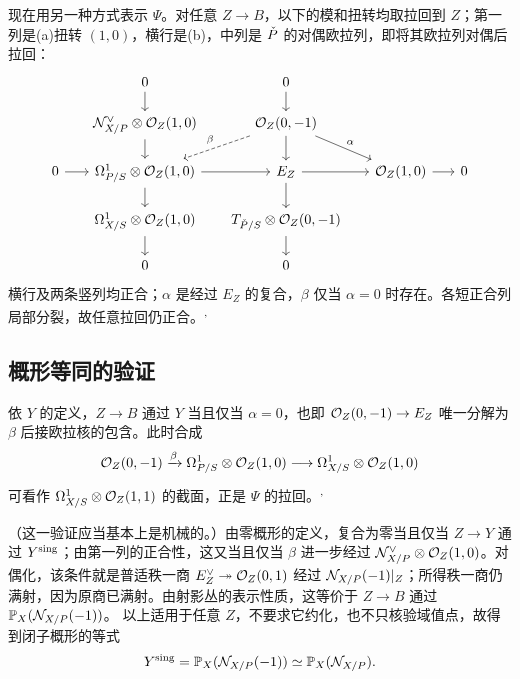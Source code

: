 现在用另一种方式表示 $\Psi$。对任意 $Z\to B$，以下的模和扭转均取拉回到 $Z$；第一列是(a)扭转 $(1,0)$，横行是(b)，中列是 $\check P$ 的对偶欧拉列，即将其欧拉列对偶后拉回：
\[
\begin{tikzcd}[row sep=3.3ex,column sep=1.6em]
 &0\arrow[d] &0\arrow[d] \\
 &\N^\vee_{X/P}\otimes\Ocal_Z(1,0)\arrow[d] &
 \Ocal_Z(0,-1)\arrow[d]\arrow[dl,dashed,swap,"\beta"]\arrow[dr,"\alpha"] \\
0\arrow[r]&\Omega^1_{P/S}\otimes\Ocal_Z(1,0)\arrow[r]\arrow[d] &
 E_Z\arrow[r]\arrow[d] &\Ocal_Z(1,0)\arrow[r]&0\\
 &\Omega^1_{X/S}\otimes\Ocal_Z(1,0)\arrow[d] &
 T_{\Pdual/S}\otimes\Ocal_Z(0,-1)\arrow[d]\\
 &0&0
\end{tikzcd}
\]
\noindent 横行及两条竖列均正合；$\alpha$ 是经过 $E_Z$ 的复合，$\beta$ 仅当 $\alpha=0$ 时存在。各短正合列局部分裂，故任意拉回仍正合。\textsuperscript{,}


\subsection*{概形等同的验证}
依 $Y$ 的定义，$Z\to B$ 通过 $Y$ 当且仅当 $\alpha=0$，也即 $\mathcal O_Z(0,-1)\to E_Z$ 唯一分解为 $\beta$ 后接欧拉核的包含。此时合成
\[
 \mathcal O_Z(0,-1)\xrightarrow{\beta}
 \Omega^1_{P/S}\otimes\mathcal O_Z(1,0)
 \longrightarrow\Omega^1_{X/S}\otimes\mathcal O_Z(1,0)
\]
可看作 $\Omega^1_{X/S}\otimes\mathcal O_Z(1,1)$ 的截面，正是 $\Psi$ 的拉回。\textsuperscript{,}

（这一验证应当基本上是机械的。）由零概形的定义，复合为零当且仅当 $Z\to Y$ 通过 $Y^{\mathrm{sing}}$；由第一列的正合性，这又当且仅当 $\beta$ 进一步经过 $\mathcal N^\vee_{X/P}\otimes\mathcal O_Z(1,0)$。对偶化，该条件就是普适秩一商 $E_Z^\vee\twoheadrightarrow\mathcal O_Z(0,1)$ 经过 $\mathcal N_{X/P}(-1)|_Z$；所得秩一商仍满射，因为原商已满射。由射影丛的表示性质，这等价于 $Z\to B$ 通过 $\mathbb P_X(\mathcal N_{X/P}(-1))$。
以上适用于任意 $Z$，不要求它约化，也不只核验域值点，故得到闭子概形的等式
\[
 Y^{\mathrm{sing}}=\mathbb P_X(\mathcal N_{X/P}(-1))\simeq\mathbb P_X(\mathcal N_{X/P}).
\]
\endgroup
